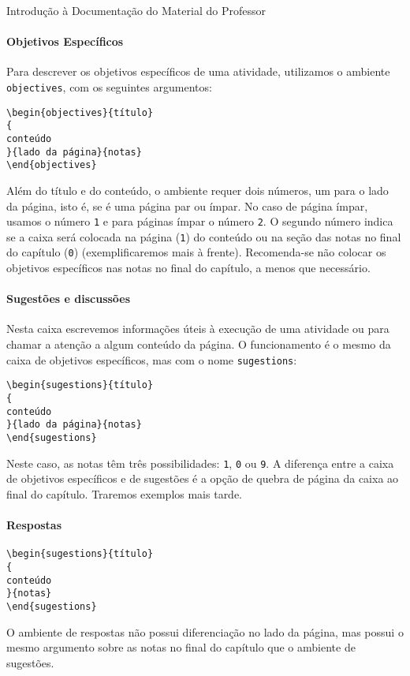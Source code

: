 \begin{apresentacao}{Introdução à Documentação do Material do Professor}
\paragraph{Objetivos Específicos}
Para descrever os objetivos específicos de uma atividade, utilizamos o ambiente \verb|objectives|, com os seguintes argumentos:
\begin{verbatim}
\begin{objectives}{título}
{
conteúdo
}{lado da página}{notas}
\end{objectives}
\end{verbatim}
Além do título e do conteúdo, o ambiente requer dois números, um para o lado da página, isto é, se é uma página par ou ímpar. No caso de página ímpar, usamos o número \verb|1| e para páginas ímpar o número \verb|2|. O segundo número indica se a caixa será colocada na página (\verb|1|) do conteúdo ou na seção das notas no final do capítulo (\verb|0|) (exemplificaremos mais à frente). Recomenda-se não colocar os objetivos específicos nas notas no final do capítulo, a menos que necessário.

\paragraph{Sugestões e discussões}
Nesta caixa escrevemos informações úteis à execução de uma atividade ou para chamar a atenção a algum conteúdo da página. O funcionamento é o mesmo da caixa de objetivos específicos, mas com o nome \verb|sugestions|:
\begin{verbatim}
\begin{sugestions}{título}
{
conteúdo
}{lado da página}{notas}
\end{sugestions}
\end{verbatim}
Neste caso, as notas têm três possibilidades: \verb|1|, \verb|0| ou \verb|9|. A diferença entre a caixa de objetivos específicos e de sugestões é a opção de quebra de página da caixa ao final do capítulo. Traremos exemplos mais tarde.

\paragraph{Respostas}
\begin{verbatim}
\begin{sugestions}{título}
{
conteúdo
}{notas}
\end{sugestions}
\end{verbatim}
O ambiente de respostas não possui diferenciação no lado da página, mas possui o mesmo argumento sobre as notas no final do capítulo que o ambiente de sugestões.


\end{apresentacao}
